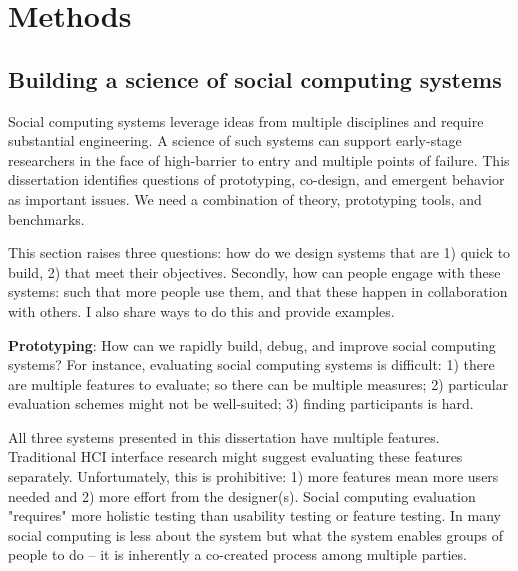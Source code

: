 

\section{Methods} 

\subsection{Building a science of social computing systems}
Social computing systems leverage ideas from multiple disciplines and require substantial engineering. A science of such systems can support early-stage researchers in the face of high-barrier to entry and multiple points of failure. This dissertation identifies questions of prototyping, co-design, and emergent behavior as important issues. We need a combination of theory, prototyping tools, and benchmarks. 

This section raises three questions: how do we design systems that are 1) quick to build, 2) that meet their objectives. Secondly, how can people engage with these systems: such that more people use them, and that these happen in collaboration with others. I also share ways to do this and provide examples.

\textbf{Prototyping}: How can we rapidly build, debug, and improve social computing systems? For instance, evaluating social computing systems is difficult: 1) there are multiple features to evaluate; so there can be multiple measures; 2) particular evaluation schemes might not be well-suited; 3) finding participants is hard.

All three systems presented in this dissertation have multiple features. Traditional HCI interface research might suggest evaluating these features separately. Unfortumately, this is prohibitive: 1) more features mean more users needed and 2) more effort from the designer(s). Social computing evaluation "requires" more holistic testing than usability testing or feature testing. In many social computing is less about the system but what the system enables groups of people to do -- it is inherently a co-created process among multiple parties. 

